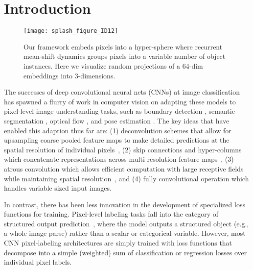 \section{Introduction}

\begin{figure}[t]
\centering
   \texttt{[image: splash\_figure\_ID12]}
   \vspace{-3.5mm}
   \caption{
   \small Our framework embeds pixels into a hyper-sphere where
   recurrent mean-shift dynamics groups pixels
   into a variable number of object instances.  Here we visualize random
   projections of a 64-dim embeddings into 3-dimensions.
   }
   \vspace{-5.mm}
\label{fig:splash_figure}
\end{figure}

The successes of deep convolutional neural nets (CNNs) at image classification
has spawned a flurry of work in computer vision on adapting these models to
pixel-level image understanding tasks, such as boundary detection
\cite{arbelaez2011contour, xie2015holistically, maninis2017convolutional},
semantic segmentation \cite{long2015fully,chen2016deeplab,kong2017recurrent},
optical flow \cite{weinzaepfel2013deepflow, dosovitskiy2015flownet}, and pose
estimation \cite{wei2016cpm, cao2017realtime}.  The key ideas that have enabled
this adaption thus far are: (1) deconvolution schemes that allow for upsampling
coarse pooled feature maps to make detailed predictions at the spatial
resolution of individual pixels~\cite{xie2015holistically,ghiasi2016laplacian},
(2) skip connections and hyper-columns which concatenate representations across
multi-resolution feature maps~\cite{hariharan2015hypercolumns,chen2016deeplab},
(3) atrous convolution which allows efficient computation with large receptive
fields while maintaining spatial resolution~\cite{chen2016deeplab,
kong2017recurrent}, and (4) fully convolutional operation which handles
variable sized input images.

In contrast, there has been less innovation in the development of specialized
loss functions for training. Pixel-level labeling tasks fall into the category
of structured output prediction~\cite{bakir2007predicting}, where the model
outputs a structured object (e.g., a whole image parse) rather than a scalar or
categorical variable.  However, most CNN pixel-labeling architectures are
simply trained with loss functions that decompose into a simple (weighted) sum
of classification or regression losses over individual pixel labels.

